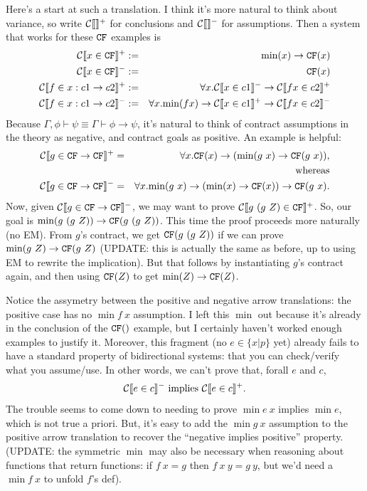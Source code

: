 \documentclass[preprint]{sigplanconf}
\begin{document}
{Here's a start at such a translation.  I
think it's more natural to think about variance, so write
$\mathcal{C} \llbracket  \rrbracket^+$ for conclusions and $\mathcal{C} \llbracket  \rrbracket^-$ for assumptions.  Then
a system that works for these $\texttt{CF}$ examples is
\protect \begin{eqnarray*}
\mathcal{C} \llbracket x \in \texttt{CF} \rrbracket^+ &:=& \mbox{min}(x) \to \texttt{CF}(x) \\
\mathcal{C} \llbracket x \in \texttt{CF} \rrbracket^- &:=& \texttt{CF}(x)\\
\mathcal{C} \llbracket f \in x:c1 \to c2 \rrbracket^+ &:=& \forall x.               
  \mathcal{C} \llbracket x \in c1 \rrbracket^- \to \mathcal{C} \llbracket f x \in c2 \rrbracket^+\\
\mathcal{C} \llbracket f \in x:c1 \to c2 \rrbracket^- &:=& \forall x. \mbox{min}(f x) \to 
  \mathcal{C} \llbracket x \in c1 \rrbracket^+ \to \mathcal{C} \llbracket f x \in c2 \rrbracket^-
\end{eqnarray*}
Because $\Gamma,\phi \vdash \psi \equiv \Gamma \vdash \phi \to \psi$,
it's natural to think of contract assumptions in the theory as
negative, and contract goals as positive.  An example is helpful:
\protect \begin{eqnarray*}
\mathcal{C} \llbracket g \in \texttt{CF} \to \texttt{CF} \rrbracket^+ &=& \forall x. \texttt{CF}(x) \to (\mbox{min}(g ~x) \to \texttt{CF}(g ~x)),\\
&&\text{whereas}\\
\mathcal{C} \llbracket g \in \texttt{CF} \to \texttt{CF} \rrbracket^- &=& \forall x. \mbox{min}(g ~x) \to (\mbox{min}(x) \to \texttt{CF}(x)) \to \texttt{CF}(g ~x).
\end{eqnarray*}
Now, given $\mathcal{C} \llbracket g \in \texttt{CF} \to \texttt{CF} \rrbracket^-$, we may 
want to prove $\mathcal{C} \llbracket g ~(g ~Z) \in \texttt{CF} \rrbracket^+$.
So, our goal is $\mbox{min}(g ~(g ~Z)) \to \texttt{CF}(g ~(g ~Z))$.
This time the proof proceeds more naturally (no EM).  
From $g$'s contract, we get $\texttt{CF}(g ~(g ~Z))$ if we can prove 
$\mbox{min}(g ~Z) \to \texttt{CF}(g ~Z)$ (UPDATE: this is actually the same as 
before, up to using EM to rewrite the implication).
But that follows by instantiating $g$'s contract again, and 
then using $\texttt{CF}(Z)$ to get $\mbox{min}(Z) \to \texttt{CF}(Z)$.

Notice the assymetry between the positive and negative arrow
translations: the positive case has no $\min{f ~x}$ assumption.  I
left this $\min{}$ out because it's already in the 
conclusion of the $\cf$ example, but I certainly haven't
worked enough examples to justify it.  Moreover, this fragment
(no $e \in \{x|p\}$ yet) already fails to have a standard
property of bidirectional systems: that you can check/verify what you assume/use.
In other words, we can't prove that, forall $e$ and $c$,
\protect \[
  \mathcal{C} \llbracket e \in c \rrbracket^- \text{ implies } \mathcal{C} \llbracket e \in c \rrbracket^+.
\]
The trouble seems to come down to needing to prove $\min{e ~x}$ implies 
$\min{e}$, which is not true a priori.  But, it's easy to add the $\min{g ~x}$ 
assumption to the positive arrow translation to recover the
 ``negative implies positive'' property. (UPDATE: the symmetric $\min{}$
may also be necessary when reasoning about functions that return functions: if
$f ~x = g$ then $f ~x ~y = g ~y$, but we'd need a $\min{f ~x}$ to unfold $f$'s def).

}
\end{document}
